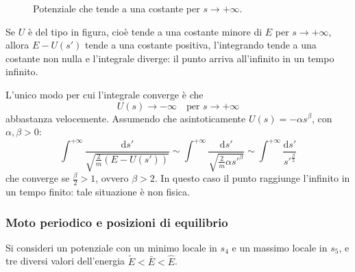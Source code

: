 \documentclass[11pt, a4paper, openright]{book}
\theoremstyle{plain}
\theoremstyle{definition}
\theoremstyle{remark}
\begin{document}
    \begin{figure}[H]
        \centering
        \caption{Potenziale che tende a una costante per $s \to +\infty$.}
    \end{figure}

    Se $U$ è del tipo in figura, cioè tende a una costante minore di $E$ per $s \to +\infty$, allora $E - U(s')$ tende a una costante positiva, l'integrando tende a una costante non nulla e l'integrale diverge: il punto arriva all'infinito in un tempo infinito.

    L'unico modo per cui l'integrale converge è che
    \begin{equation}
        U(s) \longrightarrow -\infty \quad \text{per } s \to +\infty
    \end{equation}
    abbastanza velocemente. Assumendo che asintoticamente $U(s) = -\alpha s^\beta$, con $\alpha, \beta > 0$:
    \begin{equation}
        \int^{+\infty} \frac{\mathrm{d}s'}{\sqrt{\frac{2}{m}(E - U(s'))}} \sim \int^{+\infty} \frac{\mathrm{d}s'}{\sqrt{\frac{2}{m}\alpha s'^\beta}} \sim \int^{+\infty} \frac{\mathrm{d}s'}{s'^{\frac{\beta}{2}}}
    \end{equation}
    che converge se $\frac{\beta}{2} > 1$, ovvero $\beta > 2$. In questo caso il punto raggiunge l'infinito in un tempo finito: tale situazione è non fisica.

\subsubsection{Moto periodico e posizioni di equilibrio}
    Si consideri un potenziale con un minimo locale in $s_4$ e un massimo locale in $s_5$, e tre diversi valori dell'energia $\tilde{E} < \bar{E} < \hat{E}$.
\end{document}
